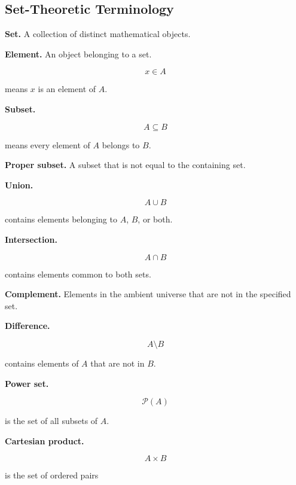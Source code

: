 \subsection{Set-Theoretic Terminology}
\label{subsec:set-theoretic-terminology}

\textbf{Set.}
A collection of distinct mathematical objects.

\medskip

\textbf{Element.}
An object belonging to a set.

\[
\boxed{
x\in A
}
\]

means \(x\) is an element of \(A\).

\medskip

\textbf{Subset.}

\[
\boxed{
A\subseteq B
}
\]

means every element of \(A\) belongs to \(B\).

\medskip

\textbf{Proper subset.}
A subset that is not equal to the containing set.

\medskip

\textbf{Union.}

\[
\boxed{
A\cup B
}
\]

contains elements belonging to \(A\), \(B\), or both.

\medskip

\textbf{Intersection.}

\[
\boxed{
A\cap B
}
\]

contains elements common to both sets.

\medskip

\textbf{Complement.}
Elements in the ambient universe that are not in the specified set.

\medskip

\textbf{Difference.}

\[
\boxed{
A\setminus B
}
\]

contains elements of \(A\) that are not in \(B\).

\medskip

\textbf{Power set.}

\[
\boxed{
\mathcal{P}(A)
}
\]

is the set of all subsets of \(A\).

\medskip

\textbf{Cartesian product.}

\[
\boxed{
A\times B
}
\]

is the set of ordered pairs

